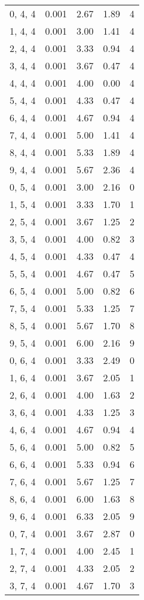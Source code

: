 \documentclass[12pt]{article}
\begin{document}
\begin{tabular}{c || c || c | c | c}
0, 4, 4 & 0.001 & 2.67 & 1.89 & 4 \\
1, 4, 4 & 0.001 & 3.00 & 1.41 & 4 \\
2, 4, 4 & 0.001 & 3.33 & 0.94 & 4 \\
3, 4, 4 & 0.001 & 3.67 & 0.47 & 4 \\
4, 4, 4 & 0.001 & 4.00 & 0.00 & 4 \\
5, 4, 4 & 0.001 & 4.33 & 0.47 & 4 \\
6, 4, 4 & 0.001 & 4.67 & 0.94 & 4 \\
7, 4, 4 & 0.001 & 5.00 & 1.41 & 4 \\
8, 4, 4 & 0.001 & 5.33 & 1.89 & 4 \\
9, 4, 4 & 0.001 & 5.67 & 2.36 & 4 \\
0, 5, 4 & 0.001 & 3.00 & 2.16 & 0 \\
1, 5, 4 & 0.001 & 3.33 & 1.70 & 1 \\
2, 5, 4 & 0.001 & 3.67 & 1.25 & 2 \\
3, 5, 4 & 0.001 & 4.00 & 0.82 & 3 \\
4, 5, 4 & 0.001 & 4.33 & 0.47 & 4 \\
5, 5, 4 & 0.001 & 4.67 & 0.47 & 5 \\
6, 5, 4 & 0.001 & 5.00 & 0.82 & 6 \\
7, 5, 4 & 0.001 & 5.33 & 1.25 & 7 \\
8, 5, 4 & 0.001 & 5.67 & 1.70 & 8 \\
9, 5, 4 & 0.001 & 6.00 & 2.16 & 9 \\
0, 6, 4 & 0.001 & 3.33 & 2.49 & 0 \\
1, 6, 4 & 0.001 & 3.67 & 2.05 & 1 \\
2, 6, 4 & 0.001 & 4.00 & 1.63 & 2 \\
3, 6, 4 & 0.001 & 4.33 & 1.25 & 3 \\
4, 6, 4 & 0.001 & 4.67 & 0.94 & 4 \\
5, 6, 4 & 0.001 & 5.00 & 0.82 & 5 \\
6, 6, 4 & 0.001 & 5.33 & 0.94 & 6 \\
7, 6, 4 & 0.001 & 5.67 & 1.25 & 7 \\
8, 6, 4 & 0.001 & 6.00 & 1.63 & 8 \\
9, 6, 4 & 0.001 & 6.33 & 2.05 & 9 \\
0, 7, 4 & 0.001 & 3.67 & 2.87 & 0 \\
1, 7, 4 & 0.001 & 4.00 & 2.45 & 1 \\
2, 7, 4 & 0.001 & 4.33 & 2.05 & 2 \\
3, 7, 4 & 0.001 & 4.67 & 1.70 & 3 \\

\end{tabular}
\end{document}
